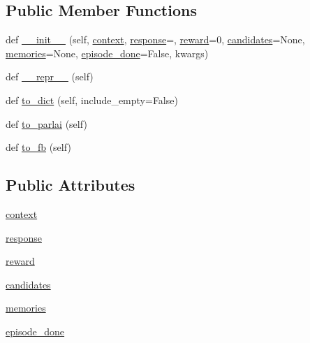 \subsection*{Public Member Functions}
\begin{DoxyCompactItemize}
\item 
def \hyperlink{classprojects_1_1self__feeding_1_1utils_1_1Parley_a6b92aa6bd0af5dd096ae189408b3ad77}{\+\_\+\+\_\+init\+\_\+\+\_\+} (self, \hyperlink{classprojects_1_1self__feeding_1_1utils_1_1Parley_adee3a4c5a893838b18aab79540456684}{context}, \hyperlink{classprojects_1_1self__feeding_1_1utils_1_1Parley_a606225dd3d555b2e55c9183f0810ba47}{response}=\textquotesingle{}\textquotesingle{}, \hyperlink{classprojects_1_1self__feeding_1_1utils_1_1Parley_a19499f2c53886bc11c811a17acca012d}{reward}=0, \hyperlink{classprojects_1_1self__feeding_1_1utils_1_1Parley_a083d2e03c1b933ef18de47015029e766}{candidates}=None, \hyperlink{classprojects_1_1self__feeding_1_1utils_1_1Parley_a94686c02f98e46dc12fa5dfe86a43c77}{memories}=None, \hyperlink{classprojects_1_1self__feeding_1_1utils_1_1Parley_af3af2f6016c023e39d59c07b9b5bf508}{episode\+\_\+done}=False, kwargs)
\item 
def \hyperlink{classprojects_1_1self__feeding_1_1utils_1_1Parley_a292050db5a9830826c1d7c8dbd8293e2}{\+\_\+\+\_\+repr\+\_\+\+\_\+} (self)
\item 
def \hyperlink{classprojects_1_1self__feeding_1_1utils_1_1Parley_a8d2421540ef61a300e999b96c66ffc96}{to\+\_\+dict} (self, include\+\_\+empty=False)
\item 
def \hyperlink{classprojects_1_1self__feeding_1_1utils_1_1Parley_a9b27cd868de896ca91a229dd38b058f5}{to\+\_\+parlai} (self)
\item 
def \hyperlink{classprojects_1_1self__feeding_1_1utils_1_1Parley_af1eb92a221df6f29ed68b6bb43ae0802}{to\+\_\+fb} (self)
\end{DoxyCompactItemize}
\subsection*{Public Attributes}
\begin{DoxyCompactItemize}
\item 
\hyperlink{classprojects_1_1self__feeding_1_1utils_1_1Parley_adee3a4c5a893838b18aab79540456684}{context}
\item 
\hyperlink{classprojects_1_1self__feeding_1_1utils_1_1Parley_a606225dd3d555b2e55c9183f0810ba47}{response}
\item 
\hyperlink{classprojects_1_1self__feeding_1_1utils_1_1Parley_a19499f2c53886bc11c811a17acca012d}{reward}
\item 
\hyperlink{classprojects_1_1self__feeding_1_1utils_1_1Parley_a083d2e03c1b933ef18de47015029e766}{candidates}
\item 
\hyperlink{classprojects_1_1self__feeding_1_1utils_1_1Parley_a94686c02f98e46dc12fa5dfe86a43c77}{memories}
\item 
\hyperlink{classprojects_1_1self__feeding_1_1utils_1_1Parley_af3af2f6016c023e39d59c07b9b5bf508}{episode\+\_\+done}
\end{DoxyCompactItemize}


